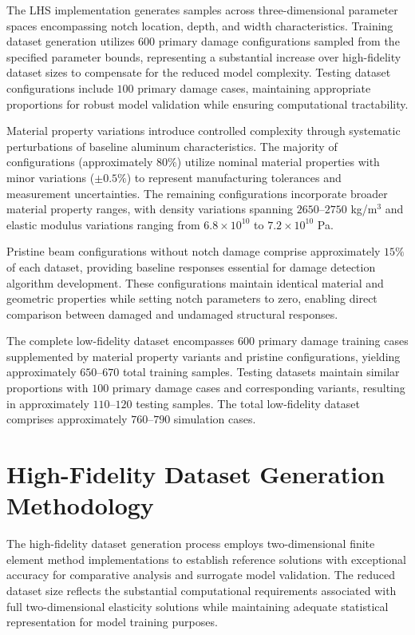 \documentclass[12pt,a4paper]{report}
\begin{document}
The LHS implementation generates samples across three-dimensional parameter spaces encompassing notch location, depth, and width characteristics. Training dataset generation utilizes $600$ primary damage configurations sampled from the specified parameter bounds, representing a substantial increase over high-fidelity dataset sizes to compensate for the reduced model complexity. Testing dataset configurations include $100$ primary damage cases, maintaining appropriate proportions for robust model validation while ensuring computational tractability.

Material property variations introduce controlled complexity through systematic perturbations of baseline aluminum characteristics. The majority of configurations (approximately $80\%$) utilize nominal material properties with minor variations ($\pm 0.5\%$) to represent manufacturing tolerances and measurement uncertainties. The remaining configurations incorporate broader material property ranges, with density variations spanning $2650$--$2750$ kg/m$^3$ and elastic modulus variations ranging from $6.8 \times 10^{10}$ to $7.2 \times 10^{10}$ Pa.

Pristine beam configurations without notch damage comprise approximately $15\%$ of each dataset, providing baseline responses essential for damage detection algorithm development. These configurations maintain identical material and geometric properties while setting notch parameters to zero, enabling direct comparison between damaged and undamaged structural responses.

The complete low-fidelity dataset encompasses $600$ primary damage training cases supplemented by material property variants and pristine configurations, yielding approximately $650$--$670$ total training samples. Testing datasets maintain similar proportions with $100$ primary damage cases and corresponding variants, resulting in approximately $110$--$120$ testing samples. The total low-fidelity dataset comprises approximately $760$--$790$ simulation cases.

\section{High-Fidelity Dataset Generation Methodology}

The high-fidelity dataset generation process employs two-dimensional finite element method implementations to establish reference solutions with exceptional accuracy for comparative analysis and surrogate model validation. The reduced dataset size reflects the substantial computational requirements associated with full two-dimensional elasticity solutions while maintaining adequate statistical representation for model training purposes.
\end{document}
